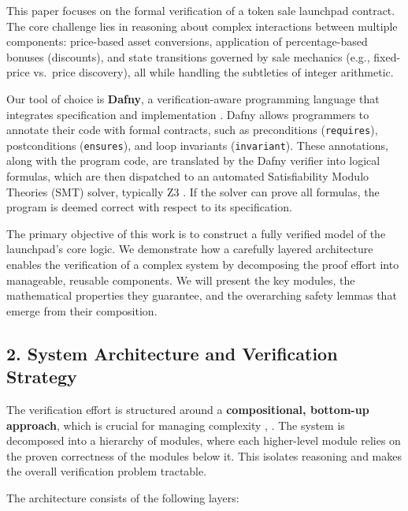 \documentclass[
  english,
  onecolumn]{article}
\begin{document}
This paper focuses on the formal verification of a token sale launchpad
contract. The core challenge lies in reasoning about complex
interactions between multiple components: price-based asset conversions,
application of percentage-based bonuses (discounts), and state
transitions governed by sale mechanics (e.g., fixed-price vs.~price
discovery), all while handling the subtleties of integer arithmetic.

Our tool of choice is \textbf{Dafny}, a verification-aware programming
language that integrates specification and implementation
. Dafny allows programmers to
annotate their code with formal contracts, such as preconditions
(\texttt{requires}), postconditions (\texttt{ensures}), and loop
invariants (\texttt{invariant}). These annotations, along with the
program code, are translated by the Dafny verifier into logical
formulas, which are then dispatched to an automated Satisfiability
Modulo Theories (SMT) solver, typically Z3
. If the solver can prove all
formulas, the program is deemed correct with respect to its
specification.

The primary objective of this work is to construct a fully verified
model of the launchpad's core logic. We demonstrate how a carefully
layered architecture enables the verification of a complex system by
decomposing the proof effort into manageable, reusable components. We
will present the key modules, the mathematical properties they
guarantee, and the overarching safety lemmas that emerge from their
composition.

\subsection{2. System Architecture and Verification
Strategy}\label{system-architecture-and-verification-strategy}

The verification effort is structured around a \textbf{compositional,
bottom-up approach}, which is crucial for managing complexity
,
. The system is decomposed
into a hierarchy of modules, where each higher-level module relies on
the proven correctness of the modules below it. This isolates reasoning
and makes the overall verification problem tractable.

The architecture consists of the following layers:
\end{document}
